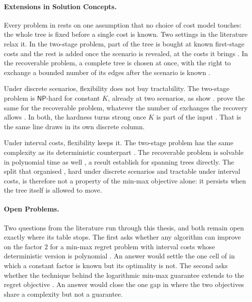 \paragraph{Extensions in Solution Concepts.}

Every problem in  rests on one assumption that no choice of cost model touches: the whole tree is fixed before a single cost is known.
Two settings in the literature relax it.
In the two-stage problem, part of the tree is bought at known first-stage costs and the rest is added once the scenario is revealed, at the costs it brings \cite[Definition~3.3]{Goerigk2021RCO}.
In the recoverable problem, a complete tree is chosen at once, with the right to exchange a bounded number of its edges after the scenario is known \cite[Definition~3.4]{Goerigk2021RCO}.

Under discrete scenarios, flexibility does not buy tractability.
The two-stage problem is $\mathsf{NP}$-hard for constant $K$, already at two scenarios, as \textcite{GoerigkKasperskiZielinski2020} show \cite[Theorem~8.17]{Goerigk2021RCO}.
\textcite{KasperskiKurpiszZielinski2014} prove the same for the recoverable problem, whatever the number of exchanges the recovery allows \cite[Theorem~8.19]{Goerigk2021RCO}.
In both, the hardness turns strong once $K$ is part of the input \cite[Theorems~8.18 and~8.20]{Goerigk2021RCO}.
That is the same line  draws in its own discrete column.

Under interval costs, flexibility keeps it.
The two-stage problem has the same complexity as its deterministic counterpart \cite[Theorem~4.10]{Goerigk2021RCO}.
The recoverable problem is solvable in polynomial time as well \cite[Corollary~8.22]{Goerigk2021RCO}, a result \textcite{HradovichKasperskiZielinski2017} establish for spanning trees directly.
The split that organised , hard under discrete scenarios and tractable under interval costs, is therefore not a property of the min-max objective alone: it persists when the tree itself is allowed to move.

\paragraph{Open Problems.}

Two questions from the literature run through this thesis, and both remain open exactly where its table stops.
The first asks whether any algorithm can improve on the factor $2$ for a min-max regret problem with interval costs whose deterministic version is polynomial \cite[Open Problem~2]{Goerigk2021RCO}.
An answer would settle the one cell of  in which a constant factor is known but its optimality is not.
The second asks whether the technique behind the logarithmic min-max guarantee extends to the regret objective \cite[Open Problem~1]{Goerigk2021RCO}.
An answer would close the one gap in  where the two objectives share a complexity but not a guarantee.

